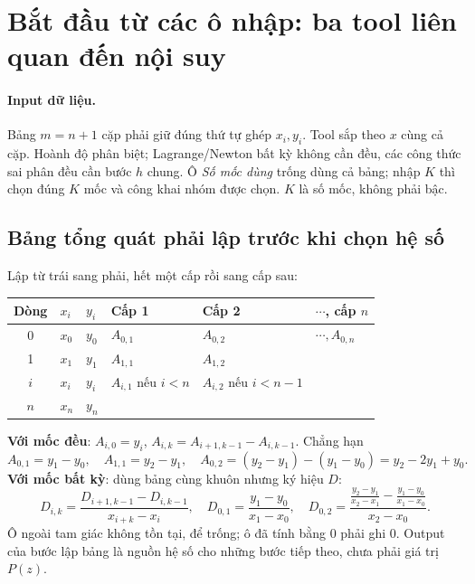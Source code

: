 \section{Bắt đầu từ các ô nhập: ba tool liên quan đến nội suy}

\paragraph{Input dữ liệu.} Bảng $m=n+1$ cặp phải giữ đúng thứ tự ghép $x_i,y_i$. Tool sắp theo $x$ cùng cả cặp. Hoành độ phân biệt; Lagrange/Newton bất kỳ không cần đều, các công thức sai phân đều cần bước $h$ chung. Ô \emph{Số mốc dùng} trống dùng cả bảng; nhập $K$ thì chọn đúng $K$ mốc và công khai nhóm được chọn. $K$ là số mốc, không phải bậc.

\subsection{Bảng tổng quát phải lập trước khi chọn hệ số}
Lập từ trái sang phải, hết một cấp rồi sang cấp sau:
\begin{center}\small\begin{tabular}{clllll}\toprule
Dòng&$x_i$&$y_i$&Cấp 1&Cấp 2&$\cdots$, cấp $n$\\\midrule
0&$x_0$&$y_0$&$A_{0,1}$&$A_{0,2}$&$\cdots,A_{0,n}$\\
1&$x_1$&$y_1$&$A_{1,1}$&$A_{1,2}$&\\
$i$&$x_i$&$y_i$&$A_{i,1}$ nếu $i<n$&$A_{i,2}$ nếu $i<n-1$&\\
$n$&$x_n$&$y_n$&&&\\\bottomrule
\end{tabular}\end{center}
\textbf{Với mốc đều}: $A_{i,0}=y_i$, $A_{i,k}=A_{i+1,k-1}-A_{i,k-1}$. Chẳng hạn
\[
A_{0,1}=y_1-y_0,\quad A_{1,1}=y_2-y_1,\quad
A_{0,2}=(y_2-y_1)-(y_1-y_0)=y_2-2y_1+y_0.
\]
\textbf{Với mốc bất kỳ}: dùng bảng cùng khuôn nhưng ký hiệu $D$:
\[
D_{i,k}=\frac{D_{i+1,k-1}-D_{i,k-1}}{x_{i+k}-x_i},\quad
D_{0,1}=\frac{y_1-y_0}{x_1-x_0},\quad
D_{0,2}=\frac{\frac{y_2-y_1}{x_2-x_1}-\frac{y_1-y_0}{x_1-x_0}}{x_2-x_0}.
\]
Ô ngoài tam giác không tồn tại, để trống; ô đã tính bằng 0 phải ghi 0. Output của bước lập bảng là nguồn hệ số cho những bước tiếp theo, chưa phải giá trị $P(z)$.

